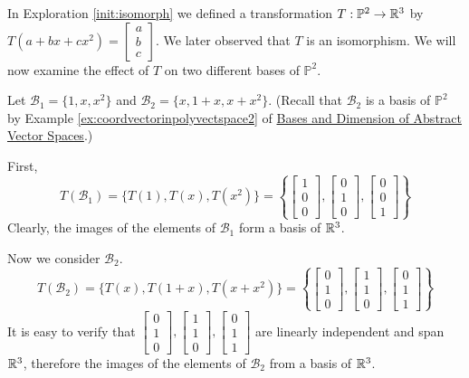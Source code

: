 \documentclass{ximera}
\begin{document}
\begin{exploration}\label{init:basestobasesiso}
In Exploration \ref{init:isomorph} we defined a transformation $T:\mathbb{P}^2\rightarrow \mathbb{R}^3$ by
$T(a+bx+cx^2)=\begin{bmatrix}a\\b\\c\end{bmatrix}$. We later observed that  $T$ is an isomorphism.  We will now examine the effect of $T$ on two different bases of $\mathbb{P}^2$.

Let 
$\mathcal{B}_1=\{1, x, x^2\}$ and $\mathcal{B}_2=\{x, 1+x, x+x^2\}$.  (Recall that $\mathcal{B}_2$ is a basis of $\mathbb{P}^2$ by Example \ref{ex:coordvectorinpolyvectspace2} of \href{https://ximera.osu.edu/linearalgebradzv3/LinearAlgebraInteractiveIntro/VSP-0060/main}{Bases and Dimension of Abstract Vector Spaces}.)

First,
$$T(\mathcal{B}_1)=\{T(1), T(x), T(x^2)\}=\left\{\begin{bmatrix}1\\0\\0\end{bmatrix}, \begin{bmatrix}0\\1\\0\end{bmatrix}, \begin{bmatrix}0\\0\\1\end{bmatrix}\right\}$$
Clearly, the images of the elements of $\mathcal{B}_1$ form a basis of $\mathbb{R}^3$.

Now we consider $\mathcal{B}_2$.
$$T(\mathcal{B}_2)=\{T(x), T(1+x), T(x+x^2)\}=\left\{\begin{bmatrix}0\\1\\0\end{bmatrix}, \begin{bmatrix}1\\1\\0\end{bmatrix}, \begin{bmatrix}0\\1\\1\end{bmatrix}\right\}$$
It is easy to verify that $\begin{bmatrix}0\\1\\0\end{bmatrix}, \begin{bmatrix}1\\1\\0\end{bmatrix}, \begin{bmatrix}0\\1\\1\end{bmatrix}$ are linearly independent and span $\mathbb{R}^3$, therefore the images of the elements of $\mathcal{B}_2$ from a basis of $\mathbb{R}^3$.

\end{exploration}
\end{document}
